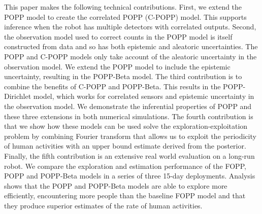 This paper makes the following technical contributions. First, we extend the POPP model to create the correlated POPP (C-POPP) model. This supports inference when the robot has multiple detectors with correlated outputs. Second, the observation model used to correct counts in the POPP model is itself constructed from data and so has both epistemic and aleatoric uncertainties. The POPP and C-POPP models only take account of the aleatoric uncertainty in the observation model. We extend the POPP model to include the epistemic uncertainty, resulting in the POPP-Beta model. The third contribution is to combine the benefits of C-POPP and POPP-Beta. This results in the POPP-Dirichlet model, which works for correlated sensors and epistemic uncertainty in the observation model. We demonstrate the inferential properties of POPP and these three extensions in both numerical simulations. The fourth contribution is that we show how these models can be used solve the exploration-exploitation problem by combining Fourier transform that allows us to exploit the periodicity of human activities with an upper bound estimate derived from the posterior. 
Finally, the fifth contribution is an extensive real world evaluation on a long-run robot. We compare the exploration and estimation performance of the FOPP, POPP and POPP-Beta models in a series of three 15-day deployments. Analysis shows that the POPP and POPP-Beta models are able to explore more efficiently, encountering more people than the baseline FOPP model and that they produce superior estimates of the rate of human activities.

% 

